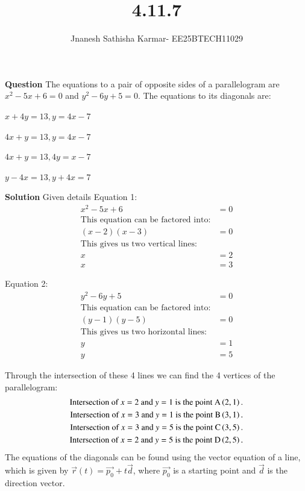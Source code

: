 \documentclass[journal]{IEEEtran}
\theoremstyle{remark}
\begin{document}
\setlength{\abovedisplayskip}{0pt}
\setlength{\belowdisplayskip}{0pt}
\setlength{\abovedisplayshortskip}{0pt}
\setlength{\belowdisplayshortskip}{0pt}

\onecolumn

\title{4.11.7}
\author{Jnanesh Sathisha Karmar- EE25BTECH11029}
\maketitle


\renewcommand{\thefigure}{\theenumi}
\renewcommand{\thetable}{\theenumi}
\textbf{Question} The equations to a pair of opposite sides of a parallelogram are $x^2 - 5x + 6 = 0$ and $y^2 - 6y + 5 = 0$. The equations to its diagonals are:
\begin{enumerate}
\begin{multicols}{2}
\item $x+4y=13,y=4x-7$
\item $4x+y=13,y=4x-7$
\item $4x+y=13,4y=x-7$
\item $y-4x=13,y+4x=7$
\end{multicols}
\end{enumerate}
\textbf{Solution} Given details
Equation 1:
\begin{align}
    x^2 - 5x + 6 &= 0 \\
    \text{This equation can be factored into:}\\
    (x-2)(x-3) &= 0 \\
    \text{This gives us two vertical lines:}\\
    x &= 2 \\
    x &= 3
\end{align}

Equation 2:
\begin{align}
    y^2 - 6y + 5 &= 0 \\
    \text{This equation can be factored into:}  \\
    (y-1)(y-5) &= 0 \\
    \text{This gives us two horizontal lines:} \\
    y &= 1 \\
    y &= 5
\end{align}

Through the intersection of these 4 lines we can find the 4 vertices of the parallelogram:
\begin{align}
    \text{Intersection of } x=2 \text{ and } y=1 \text{ is the point A}\left(2, 1\right). \\
    \text{Intersection of } x=3 \text{ and } y=1 \text{ is the point B}\left(3, 1\right). \\
    \text{Intersection of } x=3 \text{ and } y=5 \text{ is the point C}\left(3, 5\right). \\
    \text{Intersection of } x=2 \text{ and } y=5 \text{ is the point D}\left(2, 5\right).
\end{align}
The equations of the diagonals can be found using the vector equation of a line, which is given by $\vec{r}(t) = \vec{p_0} + t\vec{d}$, where $\vec{p_0}$ is a starting point and $\vec{d}$ is the direction vector.\\
\end{document}
